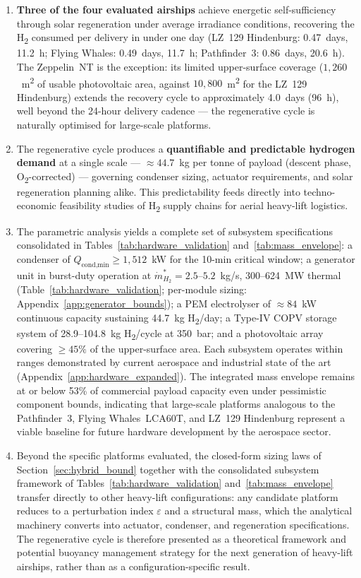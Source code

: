 \documentclass[applsci,article,submit,pdftex,moreauthors]{Definitions/mdpi}
\newcommand{\dotmstar}{\dot{m}_{H_2}^{*}}
\newcommand{\addedR}[1]{\textcolor{green!60!black}{#1}}
\begin{document}
\begin{enumerate}
\item \textbf{Three of the four evaluated airships} achieve energetic self-sufficiency through solar regeneration under average irradiance conditions, recovering the H\textsubscript{2} consumed per delivery in under one day (LZ~129 Hindenburg: 0.47~days, 11.2~h; Flying Whales: 0.49~days, 11.7~h; Pathfinder~3: 0.86~days, 20.6~h). The Zeppelin~NT is the exception: its limited upper-surface coverage ($1{,}260$~m\textsuperscript{2} of usable photovoltaic area, against $10{,}800$~m\textsuperscript{2} for the LZ~129 Hindenburg) extends the recovery cycle to approximately 4.0~days (96~h), well beyond the 24-hour delivery cadence --- the regenerative cycle is naturally optimised for large-scale platforms.
\item The regenerative cycle produces a \textbf{quantifiable and predictable hydrogen demand} at a single scale --- ${\approx}44.7$~kg per tonne of payload (descent phase, O\textsubscript{2}-corrected) --- governing condenser sizing, actuator requirements, and solar regeneration planning alike. This predictability feeds directly into techno-economic feasibility studies of H\textsubscript{2} supply chains for aerial heavy-lift logistics.
\item \addedR{The parametric analysis yields a complete set of subsystem specifications consolidated in Tables~\ref{tab:hardware_validation} and~\ref{tab:mass_envelope}: a condenser of $Q_\text{cond,min} \geq 1{,}512$~kW for the 10-min critical window; a generator unit in burst-duty operation at $\dotmstar = 2.5$--$5.2$~kg/s, 300--624~MW thermal (Table~\ref{tab:hardware_validation}; per-module sizing: Appendix~\ref{app:generator_bounds}); a PEM electrolyser of ${\approx}84$~kW continuous capacity sustaining 44.7~kg H\textsubscript{2}/day; a Type-IV COPV storage system of 28.9--104.8~kg H\textsubscript{2}/cycle at 350~bar; and a photovoltaic array covering ${\geq}45\%$ of the upper-surface area. Each subsystem operates within ranges demonstrated by current aerospace and industrial state of the art (Appendix~\ref{app:hardware_expanded}). The integrated mass envelope remains at or below 53\% of commercial payload capacity even under pessimistic component bounds, indicating that large-scale platforms analogous to the Pathfinder~3, Flying Whales~LCA60T, and LZ~129 Hindenburg represent a viable baseline for future hardware development by the aerospace sector.}
\item \addedR{Beyond the specific platforms evaluated, the closed-form sizing laws of Section~\ref{sec:hybrid_bound} together with the consolidated subsystem framework of Tables~\ref{tab:hardware_validation} and~\ref{tab:mass_envelope} transfer directly to other heavy-lift configurations: any candidate platform reduces to a perturbation index $\varepsilon$ and a structural mass, which the analytical machinery converts into actuator, condenser, and regeneration specifications. The regenerative cycle is therefore presented as a theoretical framework and potential buoyancy management strategy for the next generation of heavy-lift airships, rather than as a configuration-specific result.}
\end{enumerate}
\end{document}
